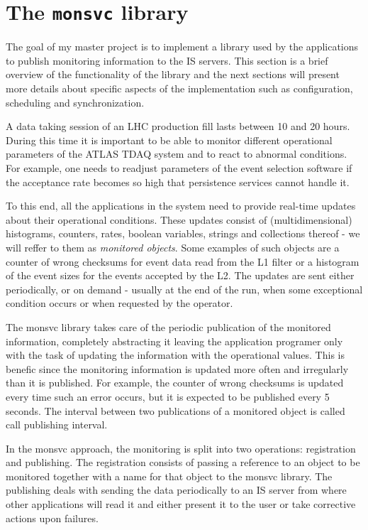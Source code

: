 \chapter{The {\tt monsvc} library} %
\label{Capitolul2}

The goal of my master project is to implement a library used by the applications to publish monitoring information to the IS servers. This section is a brief overview of the functionality of the library and the next sections will present more details about specific aspects of the implementation such as configuration, scheduling and synchronization.

A data taking session of an LHC production fill lasts between 10 and 20 hours. During this time it is important to be able to monitor different operational parameters of the ATLAS TDAQ system and to react to abnormal conditions. For example, one needs to readjust parameters of the event selection software if the acceptance rate becomes so high that persistence services cannot handle it. 

To this end, all the applications in the system need to provide real-time updates about their operational conditions. These updates consist of (multidimensional) histograms, counters, rates, boolean variables, strings and collections thereof - we will reffer to them as \emph{monitored objects}. Some examples of such objects are a counter of wrong checksums for event data read from the L1 filter or a histogram of the event sizes for the events accepted by the L2. The updates are sent either periodically, or on demand - usually at the end of the run, when some exceptional condition occurs or when requested by the operator.

The monsvc library takes care of the periodic publication of the monitored information, completely abstracting it leaving the application programer only with the task of updating the information with the operational values. This is benefic since the monitoring information is updated more often and irregularly than it is published. For example, the counter of wrong checksums is updated every time such an error occurs, but it is expected to be published every 5 seconds. The interval between two publications of a monitored object is called call publishing interval.

In the monsvc approach, the monitoring is split into two operations: registration and publishing. The registration consists of passing a reference to an object to be monitored together with a name for that object to the monsvc library. The publishing deals with sending the data periodically to an IS server from where other applications will read it and either present it to the user or take corrective actions upon failures. 

